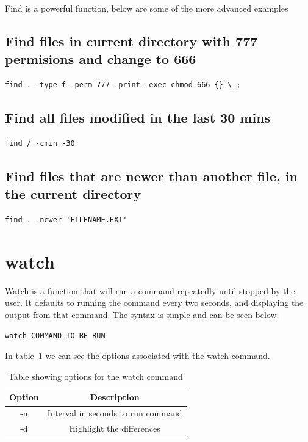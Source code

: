 Find is a powerful function, below are some of the more advanced examples

\subsection{Find files in current directory with 777 permisions and change to 666}
\begin{lstlisting}
find . -type f -perm 777 -print -exec chmod 666 {} \ ;
\end{lstlisting}

\subsection{Find all files modified in the last 30 mins}
\begin{lstlisting}
find / -cmin -30
\end{lstlisting}

\subsection{Find files that are newer than another file, in the current directory}
\begin{lstlisting}
find . -newer 'FILENAME.EXT'
\end{lstlisting}

\section{watch}
\label{sec:watch}

Watch is a function that will run a command repeatedly until stopped by the user.  It defaults to running the command every two seconds, and displaying the output from that command. The syntax is simple and can be seen below:

\begin{lstlisting}
watch COMMAND TO BE RUN
\end{lstlisting}

In table~\ref{tab:watch} we can see the options associated with the watch command.

\begin{table}[!th]
\centering
\begin{tabular}{cc}
\hline
Option & Description\\
\hline
-n & Interval in seconds to run command\\
-d & Highlight the differences\\
\hline
\end{tabular}
\caption{Table showing options for the watch command}
\label{tab:watch}
\end{table}

